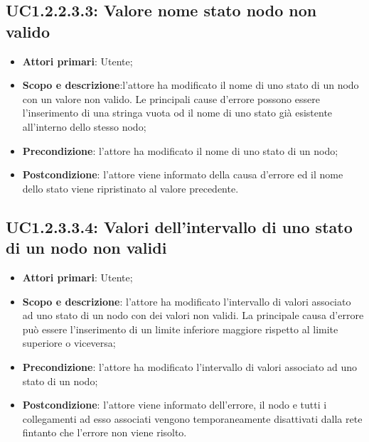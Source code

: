 \subsection{UC1.2.2.3.3: Valore nome stato nodo non valido} 
\hypertarget{UC1.2.2.3.3}{} 
\begin{itemize} 
	\item{\textbf{Attori primari}: Utente;} 
	\item{\textbf{Scopo e descrizione}:l'attore ha modificato il nome di uno stato di un nodo con un valore non valido. Le principali cause d'errore possono essere l'inserimento di una stringa vuota od il nome di uno stato già esistente all'interno dello stesso nodo;} 
	\item{\textbf{Precondizione}: l'attore ha modificato il nome di uno stato di un nodo;} 
	\item{\textbf{Postcondizione}: l'attore viene informato della causa d'errore ed il nome dello stato viene ripristinato al valore precedente.} 
\end{itemize}
\subsection{UC1.2.3.3.4: Valori dell'intervallo di uno stato di un nodo non validi} 
\hypertarget{UC1.2.2.3.4}{} 
\begin{itemize} 
	\item{\textbf{Attori primari}: Utente;} 
	\item{\textbf{Scopo e descrizione}: l'attore ha modificato l'intervallo di valori associato ad uno stato di un nodo con dei valori non validi. La principale causa d'errore può essere l'inserimento di un limite inferiore maggiore rispetto al limite superiore o viceversa;} 
	\item{\textbf{Precondizione}: l'attore ha modificato l'intervallo di valori associato ad uno stato di un nodo;} 
	\item{\textbf{Postcondizione}: l'attore viene informato dell'errore, il nodo e tutti i collegamenti ad esso associati vengono temporaneamente disattivati dalla rete fintanto che l'errore non viene risolto.} 
\end{itemize}
